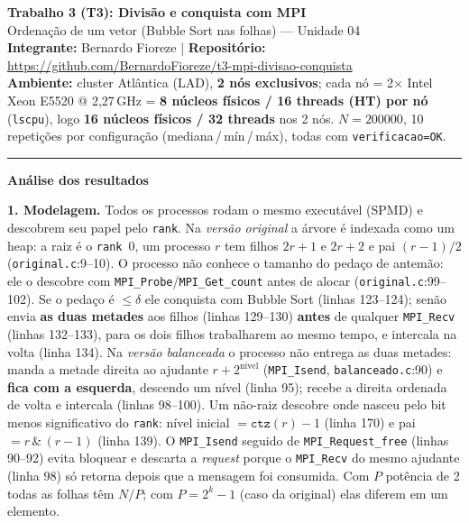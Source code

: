 \documentclass[10pt]{article}
\begin{document}
\begin{center}
  {\large\bfseries Trabalho 3 (T3): Divisão e conquista com MPI}\\[2pt]
  {\small Ordenação de um vetor (Bubble Sort nas folhas) --- Unidade 04}\\[4pt]
  {\footnotesize
   \textbf{Integrante:} Bernardo Fioreze \quad|\quad
   \textbf{Repositório:} \url{https://github.com/BernardoFioreze/t3-mpi-divisao-conquista}}\\[2pt]
  {\footnotesize
   \textbf{Ambiente:} cluster Atlântica (LAD), \textbf{2 nós exclusivos}; cada nó = 2$\times$ Intel Xeon
   E5520 @ 2,27\,GHz = \textbf{8 núcleos físicos / 16 threads (HT) por nó} (\texttt{lscpu}),
   logo \textbf{16 núcleos físicos / 32 threads} nos 2 nós. $N=200000$, 10 repetições por configuração
   (mediana\,/\,mín\,/\,máx), todas com \texttt{verificacao=OK}.}
\end{center}
\hrule
\vspace{4pt}

\textbf{\large Análise dos resultados}

\textbf{1. Modelagem.}
Todos os processos rodam o mesmo executável (SPMD) e descobrem seu papel pelo \texttt{rank}.
Na \emph{versão original} a árvore é indexada como um heap: a raiz é o \texttt{rank}~0, um processo
$r$ tem filhos $2r{+}1$ e $2r{+}2$ e pai $(r{-}1)/2$ (\texttt{original.c}:9--10). O processo não conhece
o tamanho do pedaço de antemão: ele o descobre com \texttt{MPI\_Probe}/\texttt{MPI\_Get\_count} antes de
alocar (\texttt{original.c}:99--102). Se o pedaço é $\le\delta$ ele conquista com Bubble Sort
(linhas 123--124); senão envia \textbf{as duas metades} aos filhos (linhas 129--130) \textbf{antes} de
qualquer \texttt{MPI\_Recv} (linhas 132--133), para os dois filhos trabalharem ao mesmo tempo, e
intercala na volta (linha 134). Na \emph{versão balanceada} o processo não entrega as duas metades: manda
a metade direita ao ajudante $r+2^{\text{nível}}$ (\texttt{MPI\_Isend}, \texttt{balanceado.c}:90) e
\textbf{fica com a esquerda}, descendo um nível (linha 95); recebe a direita ordenada de volta e intercala
(linhas 98--100). Um não-raiz descobre onde nasceu pelo bit menos significativo do \texttt{rank}:
nível inicial $=\texttt{ctz}(r)-1$ (linha 170) e pai $= r\,\&\,(r{-}1)$ (linha 139). O \texttt{MPI\_Isend}
seguido de \texttt{MPI\_Request\_free} (linhas 90--92) evita bloquear e descarta a \emph{request} porque o
\texttt{MPI\_Recv} do mesmo ajudante (linha 98) só retorna depois que a mensagem foi consumida. Com $P$
potência de 2 todas as folhas têm $N/P$; com $P=2^{k}-1$ (caso da original) elas diferem em um elemento.
\end{document}
